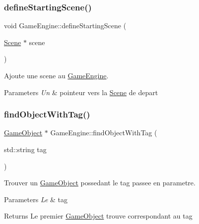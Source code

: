 \subsubsection{\texorpdfstring{define\+Starting\+Scene()}{defineStartingScene()}\hspace{0.1cm}{\footnotesize\ttfamily [2/2]}}
{\footnotesize\ttfamily void Game\+Engine\+::define\+Starting\+Scene (\begin{DoxyParamCaption}\item[{\hyperlink{class_scene}{Scene} $\ast$}]{scene }\end{DoxyParamCaption})}



Ajoute une scene au \hyperlink{class_game_engine}{Game\+Engine}. 


\begin{DoxyParams}{Parameters}
{\em Un} & pointeur vers la \hyperlink{class_scene}{Scene} de depart \\
\hline
\end{DoxyParams}
\hypertarget{class_game_engine_a92a0f7ffa3e36c93b51427dcf36a2586}{}\label{class_game_engine_a92a0f7ffa3e36c93b51427dcf36a2586} 
\subsubsection{\texorpdfstring{find\+Object\+With\+Tag()}{findObjectWithTag()}}
{\footnotesize\ttfamily \hyperlink{class_game_object}{Game\+Object} $\ast$ Game\+Engine\+::find\+Object\+With\+Tag (\begin{DoxyParamCaption}\item[{std\+::string}]{tag }\end{DoxyParamCaption})}



Trouver un \hyperlink{class_game_object}{Game\+Object} possedant le tag passee en parametre. 


\begin{DoxyParams}{Parameters}
{\em Le} & tag \\
\hline
\end{DoxyParams}
\begin{DoxyReturn}{Returns}
Le premier \hyperlink{class_game_object}{Game\+Object} trouve correspondant au tag 
\end{DoxyReturn}
\hypertarget{class_game_engine_a3c121b430cbe2b77ba53ba4cfe295322}{}\label{class_game_engine_a3c121b430cbe2b77ba53ba4cfe295322} 
